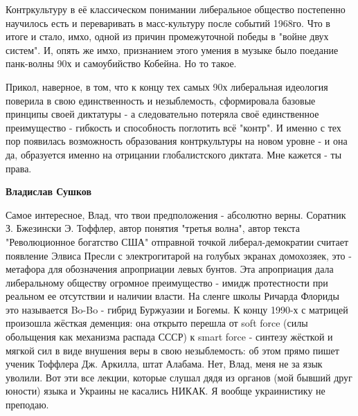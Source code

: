 \begin{itemize}
 

Контркультуру в её классическом понимании либеральное общество постепенно
научилось есть и переваривать в масс-культуру после событий 1968го. Что в итоге
и стало, имхо, одной из причин промежуточной победы в "войне двух систем". И,
опять же имхо, признанием этого умения в музыке было поедание панк-волны 90х и
самоубийство Кобейна. Но то такое.

Прикол, наверное, в том, что к концу тех самых 90х либеральная идеология
поверила в свою единственность и незыблемость, сформировала базовые принципы
своей диктатуры - а следовательно потеряла своё единственное преимущество -
гибкость и способность поглотить всё "контр". И именно с тех пор появилась
возможность образования контркультуры на новом уровне - и она да, образуется
именно на отрицании глобалистского диктата. Мне кажется - ты права.

\begin{itemize}
 
\textbf{Владислав Сушков} 

Самое интересное, Влад, что твои предположения - абсолютно верны. Соратник З.
Бжезински Э. Тоффлер, автор понятия "третья волна", автор текста "Революционное
богатство США" отправной точкой либерал-демократии считает появление Элвиса
Пресли с электрогитарой на голубых экранах домохозяек, это - метафора для
обозначения апроприации левых бунтов. Эта апроприация дала либеральному
обществу огромное преимущество - имидж протестности при реальном ее отсутствии
и наличии власти. На сленге школы Ричарда Флориды это называется Bo-Bo - гибрид
Буржуазии и Богемы. К концу 1990-х с матрицей произошла жёсткая деменция: она
открыто перешла от soft force (силы обольщения как механизма распада СССР) к
smart force - синтезу жёсткой и мягкой сил в виде внушения веры в свою
незыблемость: об этом прямо пишет ученик Тоффлера Дж. Аркилла, штат Алабама.
Нет, Влад, меня не за язык уволили. Вот эти все лекции, которые слушал дядя из
органов (мой бывший друг юности) языка и Украины не касались НИКАК. Я вообще
украинистику не преподаю.


\end{itemize}
\end{itemize}
